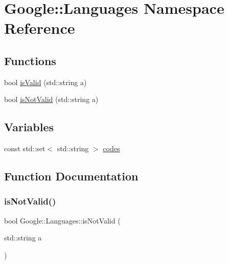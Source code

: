 \hypertarget{a00042}{}\section{Google\+:\+:Languages Namespace Reference}
\label{a00042}
\subsection*{Functions}
\begin{DoxyCompactItemize}
\item 
bool \hyperlink{a00042_a865e8f79f8de870b2e6eb5cf40b0fac9}{is\+Valid} (std\+::string a)
\item 
bool \hyperlink{a00042_a0ed7c663d00601bb86dd56e55a5304a8}{is\+Not\+Valid} (std\+::string a)
\end{DoxyCompactItemize}
\subsection*{Variables}
\begin{DoxyCompactItemize}
\item 
const std\+::set$<$ std\+::string $>$ \hyperlink{a00042_a7323c7ef1fa5d84f505aa504095b788a}{codes}
\end{DoxyCompactItemize}


\subsection{Function Documentation}
\mbox{\label{a00042_a0ed7c663d00601bb86dd56e55a5304a8}} 
\subsubsection{\texorpdfstring{is\+Not\+Valid()}{isNotValid()}}
{\footnotesize\ttfamily bool Google\+::\+Languages\+::is\+Not\+Valid (\begin{DoxyParamCaption}\item[{std\+::string}]{a }\end{DoxyParamCaption})}

\mbox{\label{a00042_a865e8f79f8de870b2e6eb5cf40b0fac9}} 
